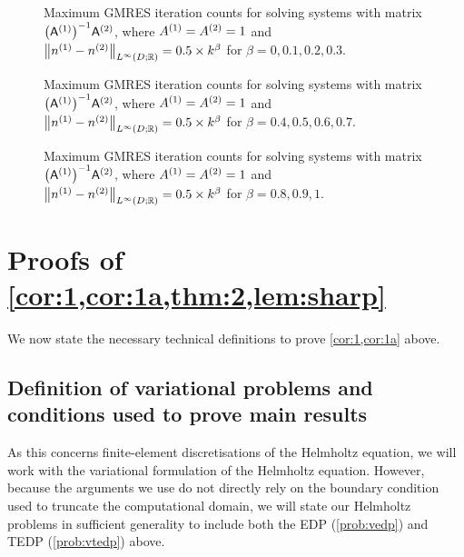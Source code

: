     \begin{figure}
      \centering

  \caption{Maximum GMRES iteration counts for solving systems with matrix $\AmatoI\Amatt$, where ${A}^{(1)}={A}^{(2)}=1$ and $\NLiDRR{\nso-\nst} = 0.5\times  k^{\beta}$ for $\beta = 0,0.1,0.2,0.3.$}\label{fig:linfinityn0}
    \end{figure}
    
    \begin{figure}
      \centering

   \caption{Maximum GMRES iteration counts for solving systems with matrix $\AmatoI\Amatt$, where ${A}^{(1)}={A}^{(2)}=1$ and $\NLiDRR{\nso-\nst} = 0.5\times  k^{\beta}$ for $\beta = 0.4,0.5,0.6,0.7.$}\label{fig:linfinityn1}
\end{figure}

    \begin{figure}
      \centering

   \caption{Maximum GMRES iteration counts for solving systems with matrix $\AmatoI\Amatt$, where ${A}^{(1)}={A}^{(2)}=1$ and $\NLiDRR{\nso-\nst} = 0.5\times  k^{\beta}$ for $\beta = 0.8,0.9,1.$}\label{fig:linfinityn2}
\end{figure}
  



\section{Proofs of \cref{cor:1,cor:1a,thm:2,lem:sharp}}\label{sec:3}

We now state the necessary technical definitions to prove \cref{cor:1,cor:1a} above.

\subsection{Definition of variational problems and conditions used to prove main results}\label{sec:vpGm}
As this  concerns finite-element discretisations of the Helmholtz equation, we will work with the variational formulation of the Helmholtz equation. However, because the arguments we use do not directly rely on the boundary condition used to truncate the computational domain, we will state our Helmholtz problems in sufficient generality to include both the EDP (\cref{prob:vedp}) and TEDP (\cref{prob:vtedp}) above.

